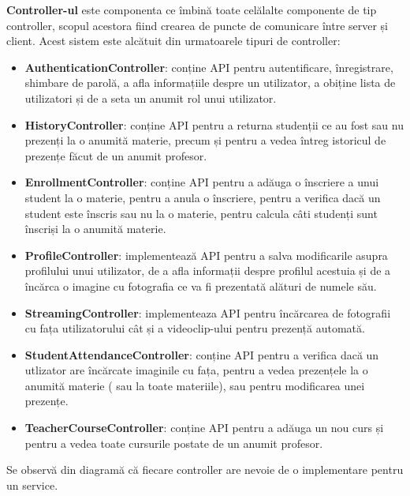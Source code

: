 \documentclass[a4paper, 12pt]{article}
\begin{document}
	\textbf{Controller-ul} este componenta ce îmbină toate celălalte componente de tip controller, scopul acestora fiind crearea de puncte de comunicare între server și client. Acest sistem este alcătuit din urmatoarele tipuri de controller:
	\begin{itemize}
		\item \textbf{AuthenticationController}: conține API pentru autentificare, înregistrare, shimbare de parolă, a afla informațiile despre un utilizator, a obiține lista de utilizatori și de a seta un anumit rol unui utilizator.
		\item \textbf{HistoryController}: conține API pentru a returna studenții ce au fost sau nu prezenți la o anumită materie, precum și pentru a vedea întreg istoricul de prezențe făcut de un anumit profesor.
		\item \textbf{EnrollmentController}: conține API pentru a adăuga o înscriere a unui student la o materie, pentru a anula o înscriere, pentru a verifica dacă un student este înscris sau nu la o materie, pentru calcula câti studenți sunt înscriși la o anumită materie.
		\item \textbf{ProfileController}: implementează API pentru a salva modificarile asupra profilului unui utilizator, de a afla informații despre profilul acestuia și de a încărca o imagine cu fotografia ce va fi prezentată alături de numele său.
		\item \textbf{StreamingController}: implementeaza API pentru încărcarea de fotografii cu fața utilizatorului cât și a videoclip-ului pentru prezență automată.
		\item \textbf{StudentAttendanceController}: conține API pentru a verifica dacă un utlizator are încărcate imaginile cu fața, pentru a vedea prezențele la o anumită materie ( sau la toate materiile), sau pentru modificarea unei prezențe.
		\item \textbf{TeacherCourseController}: conține API pentru a adăuga un nou curs și pentru a vedea toate cursurile postate de un anumit profesor.
	\end{itemize}
	
	Se observă din diagramă că fiecare controller are nevoie de o implementare pentru un service.
	
\end{document}
